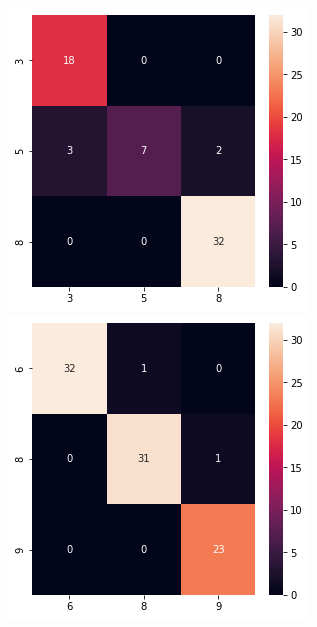 \documentclass[a4paper,10pt]{report}
\begin{document}
\begin{figure}[!htb]
    \includegraphics[width=\linewidth]{3_5_8_cm.png}
  \endminipage\hfill
  \includegraphics[width=\linewidth]{6_8_9_cm.png}

\end{figure}
\end{document}
